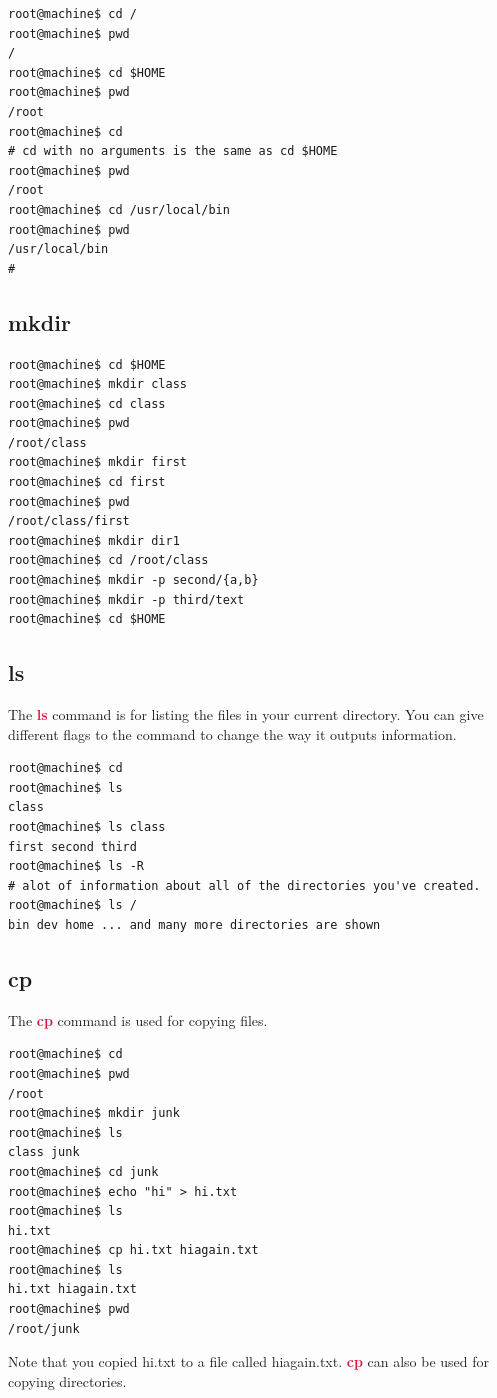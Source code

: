 \documentclass[12pt,letter]{article}
\newcommand{\bashcommand}[1]{\textcolor{crimson}{\textbf{#1}}}
\begin{document}
\begin{lstlisting}[style=term]
root@machine$ cd /
root@machine$ pwd
/
root@machine$ cd $HOME
root@machine$ pwd
/root
root@machine$ cd
# cd with no arguments is the same as cd $HOME
root@machine$ pwd
/root
root@machine$ cd /usr/local/bin
root@machine$ pwd
/usr/local/bin
#\end{lstlisting}

\subsection{mkdir}
\begin{lstlisting}[style=term]
root@machine$ cd $HOME
root@machine$ mkdir class
root@machine$ cd class
root@machine$ pwd
/root/class
root@machine$ mkdir first
root@machine$ cd first
root@machine$ pwd
/root/class/first
root@machine$ mkdir dir1
root@machine$ cd /root/class
root@machine$ mkdir -p second/{a,b}
root@machine$ mkdir -p third/text
root@machine$ cd $HOME
\end{lstlisting}

\subsection{ls}
The \bashcommand{ls} command is for listing the files in your current directory. You can give different flags to the command to change the way it outputs information.
\begin{lstlisting}[style=term]
root@machine$ cd 
root@machine$ ls 
class
root@machine$ ls class
first second third
root@machine$ ls -R
# alot of information about all of the directories you've created.
root@machine$ ls /
bin dev home ... and many more directories are shown
\end{lstlisting}

\subsection{cp}
The \bashcommand{cp} command is used for copying files.
\begin{lstlisting}[style=term]
root@machine$ cd 
root@machine$ pwd
/root
root@machine$ mkdir junk
root@machine$ ls
class junk
root@machine$ cd junk
root@machine$ echo "hi" > hi.txt
root@machine$ ls
hi.txt
root@machine$ cp hi.txt hiagain.txt
root@machine$ ls
hi.txt hiagain.txt
root@machine$ pwd
/root/junk
\end{lstlisting}

Note that you copied hi.txt to a file called hiagain.txt. \bashcommand{cp} can also be used for copying directories.
\end{document}
